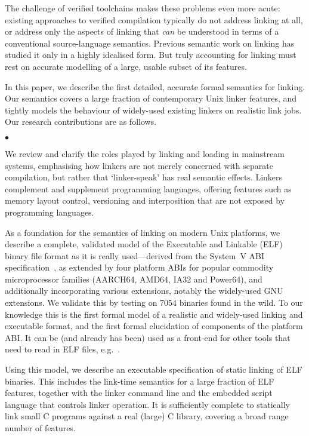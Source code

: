 \documentclass[preprint,10pt]{sigplanconf-pldi16}
\newcommand{\mynote}[2]{}
\newcommand{\sk}[1]{\mynote{SK}{#1}}
\newcommand{\ps}[1]{\mynote{PS}{#1}}
\def\Cplusplus{C\kern-0.08em\raise.2ex\hbox{\footnotesize +\kern-0.08em +}}
\newenvironment{verytightitemize}{
\begin{list}{\hspace*{-2mm}$\bullet$}{
  \setlength{\itemsep}{1pt}
  \setlength{\topsep}{2pt}
  \setlength{\parskip}{0pt}
  \setlength{\leftmargin}{2mm}
  \setlength{\labelwidth}{0pt}
  \settowidth{\itemindent}{$\bullet$}
  \addtolength{\itemindent}{0mm}
  \setlength{\parsep}{0pt}}}{\end{list}
}
\begin{document}
The challenge of verified toolchains makes these problems even more acute: existing
approaches to verified compilation typically do not address linking at
all, or address only the aspects
of linking that \emph{can} be understood in terms of a conventional
source-language semantics. 
Previous semantic work on linking
has studied it only in a highly idealised form. But 
truly accounting for linking must rest on accurate modelling of a large, usable subset of its features.

In this paper, we describe the first detailed, accurate formal semantics for linking. 
Our semantics covers a large fraction of contemporary Unix linker features, and tightly models the behaviour of widely-used existing linkers on realistic link jobs.
Our research contributions are as follows.

\begin{verytightitemize}
\item
We review and clarify the roles played by linking and loading in mainstream systems, emphasising
how linkers are not merely concerned with separate compilation, but rather that `linker-speak' has real semantic effects.
Linkers complement and supplement programming languages, offering
features such as memory layout control, versioning and interposition
that are not exposed by programming languages. %


\item As a foundation for the semantics of linking on modern Unix
  platforms, we describe a complete, validated  model of the
  Executable and Linkable (ELF) binary file format as it is really
  used---derived from the System~V ABI
  specification~\cite{elf-sco-model}, as extended by four platform ABIs
  for popular commodity microprocessor families (AARCH64, AMD64, IA32
  and Power64), and additionally incorporating various extensions,
  notably the widely-used GNU extensions.  
We validate this by testing on 7054 binaries found in the wild.
To our knowledge this is the first formal model of a realistic and
widely-used linking and executable format, and the first formal
elucidation of components of the platform ABI.  It can be (and already
has been) used as a front-end for other tools that need to read in ELF
files, e.g.~\cite{gray-integrated-2015,FGP16}.

\item Using this model, we describe an executable specification of static linking of ELF binaries.
This includes the link-time semantics for a large fraction of ELF features, 
together with the linker command line and the embedded script language
that controls linker operation.
It is sufficiently complete to statically link small C programs
against a real (large) C library, covering a broad range number of features.
 \sk{I want to forward-ref the relevant section here;add forward-refs to each major section?}
\end{verytightitemize}
\end{document}
